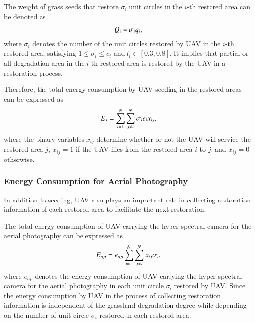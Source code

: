 \documentclass[preprint,5pt]{elsarticle}
\begin{document}
The weight of grass seeds that restore $\sigma_i$ unit circles in the $i$-th restored area can be denoted as
\begin{equation} \label{units-area-seeding}
\begin{small}
Q_i = \sigma_i q_i,
\end{small}
\end{equation}
where $\sigma_i$ denotes the number of the unit circles restored by UAV in the $i$-th restored area, satisfying $1 \leq \sigma_i \leq c_i$ and $l_i \in [0.3,0.8]$. It implies that partial or all degradation area in the $i$-th restored area is restored by the UAV in a restoration process.

Therefore, the total energy consumption by UAV seeding in the restored areas can be expressed as
\begin{equation} \label{seeding-energy}
\begin{small}
E_s = \sum^N_{i = 1}\sum^N_{j \neq i}\sigma_i e_i x_{ij},
\end{small}
\end{equation}
where
the binary variables $x_{ij}$  determine whether or not the UAV will service the restored area $j$, $x_{ij} = 1$ if the UAV flies from the restored area $i$ to $j$, and $x_{ij} = 0$ otherwise.
\subsubsection{Energy Consumption for Aerial Photography}
In addition to seeding, UAV also plays an important role in collecting restoration information of each restored area to facilitate the next restoration.

The total energy consumption of UAV carrying the hyper-spectral camera for the aerial photography can be expressed as
\begin{equation} \label{hyper-spectral-camera-energy}
\begin{scriptsize}
E_{ap} = e_{ap}\sum^N_{i=1}\sum^N_{j \neq i} x_{ij}\sigma_i,
\end{scriptsize}
\end{equation}
where $e_{ap}$ denotes the energy consumption of UAV carrying the hyper-spectral camera for the aerial photography in each unit circle $\sigma_i$ restored by UAV. Since the energy consumption by UAV in the process of collecting restoration information is independent of the grassland degradation degree while depending on the number of unit circle $\sigma_i$ restored in each restored area.
\end{document}
